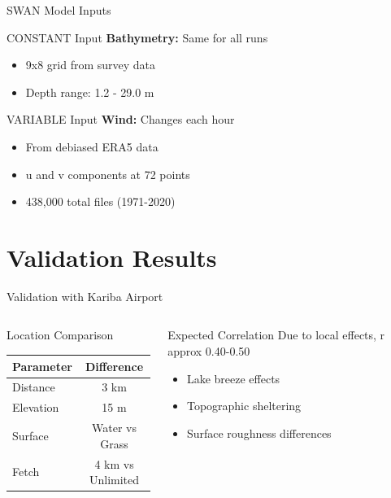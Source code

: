 \documentclass[10pt]{beamer}
\begin{document}
\begin{frame}{SWAN Model Inputs}
\begin{block}{CONSTANT Input}
\textbf{Bathymetry:} Same for all runs
\begin{itemize}
    \item 9x8 grid from survey data
    \item Depth range: 1.2 - 29.0 m
\end{itemize}
\end{block}

\begin{block}{VARIABLE Input}
\textbf{Wind:} Changes each hour
\begin{itemize}
    \item From debiased ERA5 data
    \item u and v components at 72 points
    \item 438,000 total files (1971-2020)
\end{itemize}
\end{block}
\end{frame}

\section{Validation Results}

\begin{frame}{Validation with Kariba Airport}
\begin{columns}
\begin{block}{Location Comparison}
\begin{tabular}{lc}
\hline
\textbf{Parameter} & \textbf{Difference} \\
\hline
Distance & 3 km \\
Elevation & 15 m \\
Surface & Water vs Grass \\
Fetch & 4 km vs Unlimited \\
\hline
\end{tabular}
\end{block}

\begin{block}{Expected Correlation}
Due to local effects, r approx 0.40-0.50
\begin{itemize}
    \item Lake breeze effects
    \item Topographic sheltering
    \item Surface roughness differences
\end{itemize}
\end{block}
\end{columns}
\end{frame}
\end{document}
